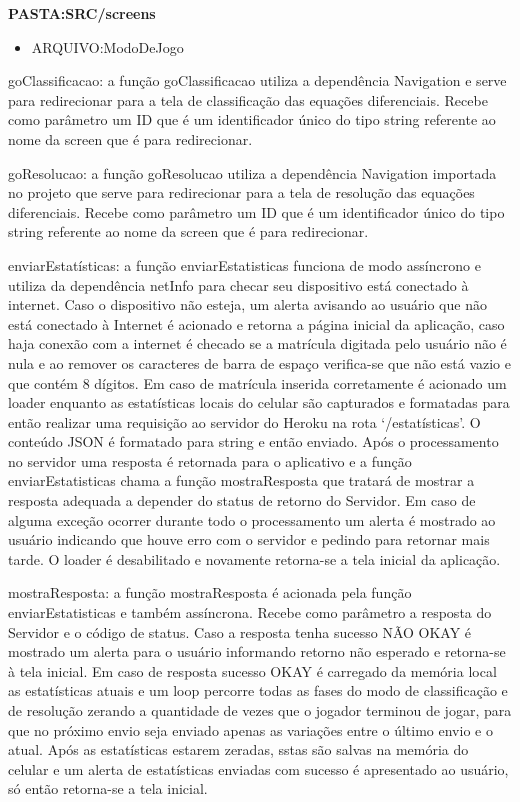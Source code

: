 \textbf{PASTA:SRC/screens}
\begin{itemize}
\item ARQUIVO:ModoDeJogo
\end{itemize}
goClassificacao: a função goClassificacao utiliza a dependência Navigation e serve para redirecionar para a tela de classificação das equações diferenciais. Recebe como parâmetro um ID que é um identificador único do tipo string referente ao nome da screen que é para redirecionar.

goResolucao: a função goResolucao utiliza a dependência Navigation importada no projeto que serve para redirecionar para a tela de resolução das equações diferenciais. Recebe como parâmetro um ID que é um identificador único do tipo string referente ao nome da screen que é para redirecionar.

enviarEstatísticas: a função enviarEstatisticas funciona de modo assíncrono e utiliza da dependência netInfo para checar seu dispositivo está conectado à internet. Caso o dispositivo não esteja, um alerta avisando ao usuário que não está conectado à Internet é acionado e retorna a página inicial da aplicação, caso haja conexão com a internet é checado se a matrícula digitada pelo usuário não é nula e ao remover os caracteres de barra de espaço verifica-se que não está vazio e que contém 8 dígitos. Em caso de matrícula inserida corretamente é acionado um loader enquanto as estatísticas locais do celular são capturados e formatadas para então realizar uma requisição ao servidor do Heroku na rota ‘/estatísticas’. O conteúdo JSON é formatado para string e então enviado. Após o processamento no servidor uma resposta é retornada para o aplicativo e a função enviarEstatisticas chama a função mostraResposta que tratará de mostrar a resposta adequada a depender do status de retorno do Servidor. Em caso de alguma exceção ocorrer durante todo o processamento um alerta é mostrado ao usuário indicando que houve erro com o servidor e pedindo para retornar mais tarde. O loader é desabilitado e novamente retorna-se a tela inicial da aplicação.

mostraResposta: a função mostraResposta é acionada pela função enviarEstatisticas e também assíncrona. Recebe como parâmetro a resposta do Servidor e o código de status. Caso a resposta tenha sucesso NÃO OKAY é mostrado um alerta para o usuário informando retorno não esperado e retorna-se à tela inicial. Em caso de resposta sucesso OKAY é carregado da memória local as estatísticas atuais e um loop percorre todas as fases do modo de classificação e de resolução zerando a quantidade de vezes que o jogador terminou de jogar, para que no próximo envio seja enviado apenas as variações entre o último envio e o atual. Após as estatísticas estarem zeradas, sstas são salvas na memória do celular e um alerta de estatísticas enviadas com sucesso é apresentado ao usuário, só então retorna-se a tela inicial.

